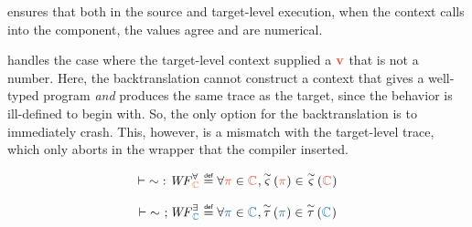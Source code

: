 \begin{center}
\end{center}
 ensures that both in the source and target-level execution, when the context calls into the component, the values agree and are numerical.

 handles the case where the target-level context supplied a $\trg{v}$ that is not a number.
Here, the backtranslation cannot construct a context that gives a well-typed program {\em and} produces the same trace as the target, since the behavior is ill-defined to begin with.
So, the only option for the backtranslation is to immediately crash.
This, however, is a mismatch with the target-level trace, which only aborts in the wrapper that the compiler inserted.

\begin{definition}{}
  \[
    \mapUniversalWF{\sim}{\trgClass} \isdef \forall \trgProperty\in\trgClass, \mapUniversal{\sim}{\trgProperty}\in\mapUniversal{\sim}{\trgClass}
  \]
\end{definition}
\begin{definition}{}
  \[
    \mapExistentialWF{\sim}{\srcClass} \isdef \forall \srcProperty\in\srcClass, \mapExistential{\sim}{\srcProperty}\in\mapExistential{\sim}{\srcClass}
  \]
\end{definition}


